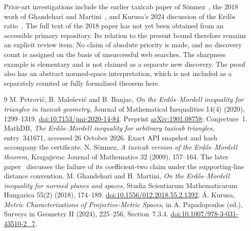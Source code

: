 \documentclass[11pt]{article}
\begin{document}
Prior-art investigations include the earlier taxicab paper of S\"onmez~\cite{sonmez}, the 2018 work of Ghandehari and Martini~\cite{gm}, and Kurusa's 2024 discussion of the Erd\H{o}s ratio~\cite{kurusa}. The full text of the 2018 paper has not yet been obtained from an accessible primary repository. Its relation to the present bound therefore remains an explicit review item. No claim of absolute priority is made, and no discovery count is assigned on the basis of unsuccessful web searches. The sharpness example is elementary and is not claimed as a separate new discovery. The proof also has an abstract normed-space interpretation, which is not included as a separately counted or fully formalized theorem here.

\clearpage
\begin{thebibliography}{9}
 M. Petrovi\'c, B. Male\v{s}evi\'c and B. Banjac, \emph{On the Erd\H{o}s--Mordell inequality for triangles in taxicab geometry}, Journal of Mathematical Inequalities 14(4) (2020), 1299--1319. \href{https://doi.org/10.7153/jmi-2020-14-84}{doi:10.7153/jmi-2020-14-84}. Preprint \href{https://arxiv.org/abs/1901.08758}{arXiv:1901.08758}; Conjecture~1.
 MathDB, \emph{The Erd\H{o}s--Mordell inequality for arbitrary taxicab triangles}, entry~341671, accessed 26 October 2026. Exact API snapshot and hash accompany the certificate.
 N. S\"onmez, \emph{A taxicab version of the Erd\H{o}s--Mordell theorem}, Kragujevac Journal of Mathematics 32 (2009), 157--164. The later paper~\cite{pmb} discusses the failure of its coefficient-two claim under the supporting-line distance convention.
 M. Ghandehari and H. Martini, \emph{On the Erd\H{o}s--Mordell inequality for normed planes and spaces}, Studia Scientiarum Mathematicarum Hungarica 55(2) (2018), 174--189. \href{https://doi.org/10.1556/012.2018.55.2.1392}{doi:10.1556/012.2018.55.2.1392}.
 \'A. Kurusa, \emph{Metric Characterizations of Projective-Metric Spaces}, in A. Papadopoulos (ed.), Surveys in Geometry II (2024), 225--256, Section~7.3.4. \href{https://doi.org/10.1007/978-3-031-43510-2_7}{doi:10.1007/978-3-031-43510-2\_7}.
\end{thebibliography}
\end{document}
